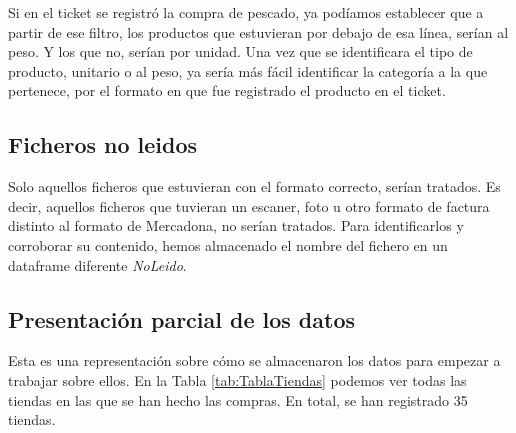 \documentclass[
]{article}
\begin{document}
Si en el ticket se registró la compra de pescado, ya podíamos establecer que a partir de ese filtro, los productos que estuvieran por debajo de esa línea, serían al peso. Y los que no, serían por unidad. Una vez que se identificara el tipo de producto, unitario o al peso, ya sería más fácil identificar la categoría a la que pertenece, por el formato en que fue registrado el producto en el ticket.

\subsection{Ficheros no leidos}\label{ficheros-no-leidos}

Solo aquellos ficheros que estuvieran con el formato correcto, serían tratados. Es decir, aquellos ficheros que tuvieran un escaner, foto u otro formato de factura distinto al formato de Mercadona, no serían tratados. Para identificarlos y corroborar su contenido, hemos almacenado el nombre del fichero en un dataframe diferente \emph{NoLeido}.

\subsection{Presentación parcial de los datos}\label{presentaciuxf3n-parcial-de-los-datos}

Esta es una representación sobre cómo se almacenaron los datos para empezar a trabajar sobre ellos. En la Tabla \ref{tab:TablaTiendas} podemos ver todas las tiendas en las que se han hecho las compras. En total, se han registrado 35 tiendas.
\end{document}
